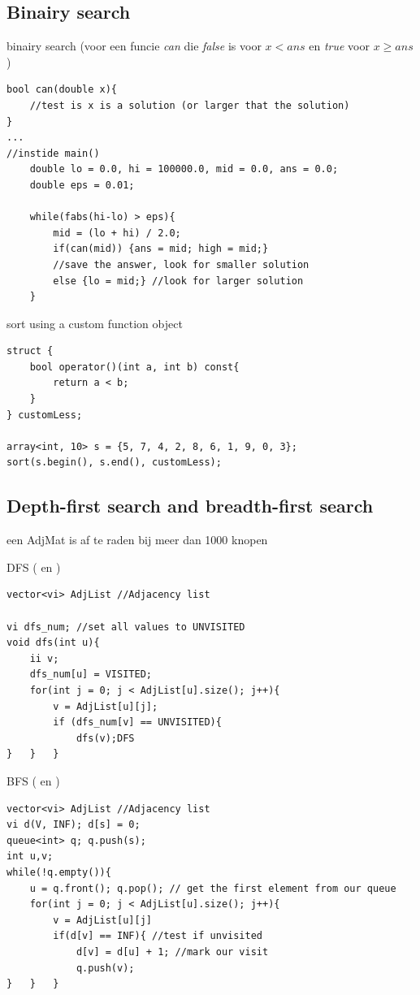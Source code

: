 \documentclass[10pt,a4paper,titlepage]{article}
\DeclareMathOperator{\bigO}{\mathcal{O}}
\begin{document}
\subsection{Binairy search}
binairy search (voor een funcie \emph{can} die \emph{false} is voor $x < ans$ en \emph{true} voor $x\geq ans$)

\begin{lstlisting}
bool can(double x){
	//test is x is a solution (or larger that the solution)
}
...
//instide main()
	double lo = 0.0, hi = 100000.0, mid = 0.0, ans = 0.0;
	double eps = 0.01;
	
	while(fabs(hi-lo) > eps){
		mid = (lo + hi) / 2.0;
		if(can(mid)) {ans = mid; high = mid;} 
		//save the answer, look for smaller solution
		else {lo = mid;} //look for larger solution
	}
\end{lstlisting}
sort using a custom function object
\begin{lstlisting}
struct {
	bool operator()(int a, int b) const{   
		return a < b;
	}   
} customLess;

array<int, 10> s = {5, 7, 4, 2, 8, 6, 1, 9, 0, 3}; 
sort(s.begin(), s.end(), customLess);
\end{lstlisting}

\subsection{Depth-first search and breadth-first search}

een AdjMat is af te raden bij meer dan 1000 knopen

DFS (\bigO{V+E} en \bigO{V^2})
\begin{lstlisting}
vector<vi> AdjList //Adjacency list

vi dfs_num; //set all values to UNVISITED
void dfs(int u){
	ii v;
	dfs_num[u] = VISITED;
	for(int j = 0; j < AdjList[u].size(); j++){
		v = AdjList[u][j];
		if (dfs_num[v] == UNVISITED){
			dfs(v);DFS
}	}	}
\end{lstlisting}

BFS (\bigO{V+E} en \bigO{V^2})

\begin{lstlisting}
vector<vi> AdjList //Adjacency list
vi d(V, INF); d[s] = 0;
queue<int> q; q.push(s);
int u,v;
while(!q.empty()){
	u = q.front(); q.pop(); // get the first element from our queue
	for(int j = 0; j < AdjList[u].size(); j++){
		v = AdjList[u][j]
		if(d[v] == INF){ //test if unvisited
			d[v] = d[u] + 1; //mark our visit
			q.push(v);
}	}	}
\end{lstlisting}
\end{document}
